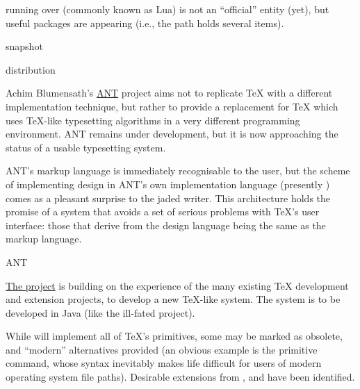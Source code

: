 \latex{} running over \luatex{} (commonly known as Lua\latex{}) is not
an ``official'' entity (yet), but useful packages are
appearing (i.e., the \ctan{} path  holds
several items).
\begin{ctanrefs}
\item[\nothtml{\rmfamily}\luatex{} snapshot]
\item[\nothtml{\rmfamily}\pdftex{} distribution]
\end{ctanrefs}


Achim Blumensath's \href{http://ant.berlios.de}{\textsf{ANT}} project
aims not to replicate \TeX{} with a different implementation
technique, but rather to provide a replacement for \TeX{} which uses
\TeX{}-like typesetting algorithms in a very different programming
environment.  \textsf{ANT} remains under development, but it is now
approaching the status of a usable typesetting system.

\textsf{ANT}'s markup language is immediately recognisable to the
\AllTeX{} user, but the scheme of implementing design in
\textsf{ANT}'s own implementation language (presently
) comes as a pleasant surprise to the jaded 
writer.  This architecture holds the promise of a system that avoids a
set of serious problems with \TeX{}'s user interface: those that
derive from the design language being the same as the markup language.
\begin{ctanrefs}
\item[\textsf{ANT}]
\end{ctanrefs}


\href{http://www.extex.org/}{The \ExTeX{} project} is
building on the experience of the many existing \TeX{} development and
extension projects, to develop a new \TeX{}-like system.  The system
is to be developed in Java (like the ill-fated \NTS{} project).

While \ExTeX{} will implement all of \TeX{}'s primitives, some may be
marked as obsolete, and ``modern'' alternatives provided (an obvious
example is the primitive  command, whose syntax inevitably
makes life difficult for users of modern operating system file
paths).  Desirable extensions from ,
 and 
have been identified.

